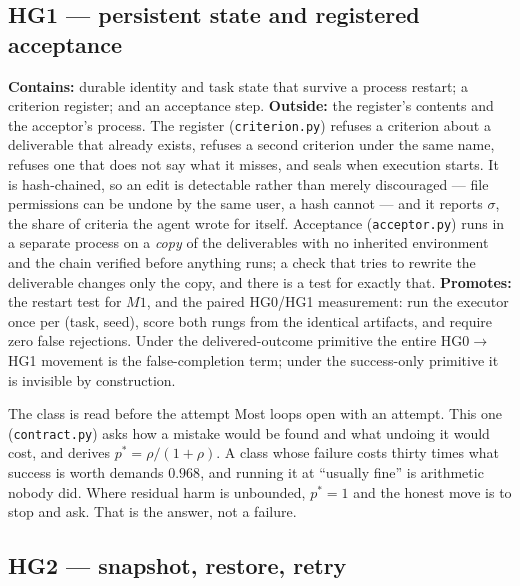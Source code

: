\documentclass[11pt]{article}
\theoremstyle{definition}
\begin{document}
\subsection{HG1 --- persistent state and registered acceptance}

\textbf{Contains:} durable identity and task state that survive a process restart; a criterion register; and an acceptance step. \textbf{Outside:} the register's contents and the acceptor's process. The register (\texttt{criterion.py}) refuses a criterion about a deliverable that already exists, refuses a second criterion under the same name, refuses one that does not say what it misses, and seals when execution starts. It is hash-chained, so an edit is detectable rather than merely discouraged --- file permissions can be undone by the same user, a hash cannot --- and it reports $\sigma$, the share of criteria the agent wrote for itself. Acceptance (\texttt{acceptor.py}) runs in a separate process on a \emph{copy} of the deliverables with no inherited environment and the chain verified before anything runs; a check that tries to rewrite the deliverable changes only the copy, and there is a test for exactly that. \textbf{Promotes:} the restart test for $M1$, and the paired HG0/HG1 measurement: run the executor once per (task, seed), score both rungs from the identical artifacts, and require zero false rejections. Under the delivered-outcome primitive the entire HG0$\to$HG1 movement is the false-completion term; under the success-only primitive it is invisible by construction.

\begin{cautionbox}{The class is read before the attempt}
Most loops open with an attempt. This one (\texttt{contract.py}) asks how a mistake would be found and what undoing it would cost, and derives $p^{*} = \rho/(1+\rho)$. A class whose failure costs thirty times what success is worth demands $0.968$, and running it at ``usually fine'' is arithmetic nobody did. Where residual harm is unbounded, $p^{*} = 1$ and the honest move is to stop and ask. That is the answer, not a failure.
\end{cautionbox}

\subsection{HG2 --- snapshot, restore, retry}
\end{document}
